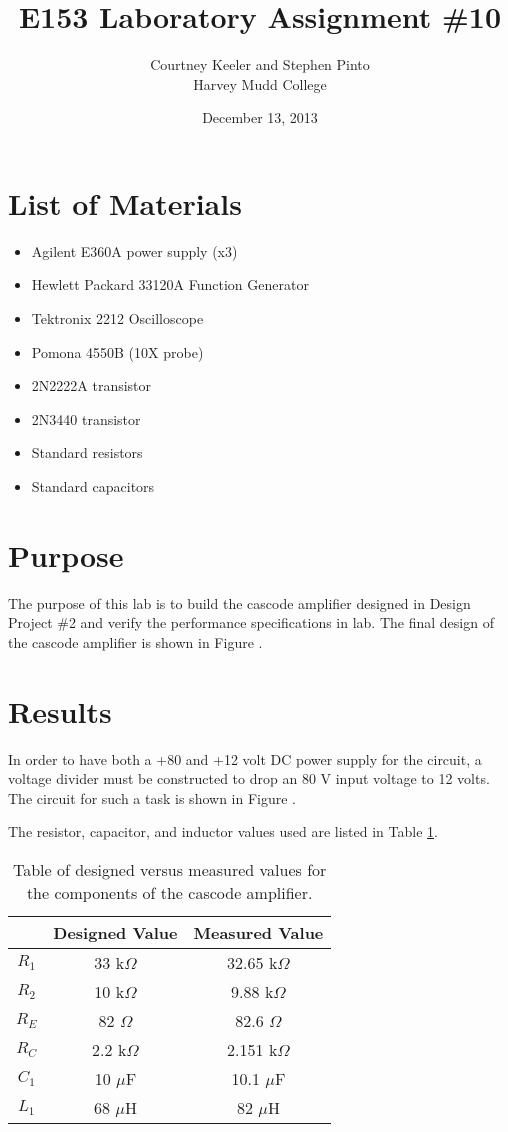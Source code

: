 \documentclass[12pt,letterpaper]{report}
\begin{document}
\title{E153 Laboratory Assignment \#10}
\author{Courtney Keeler and Stephen Pinto\\
Harvey Mudd College}
\date{December 13, 2013}
\maketitle

\section*{List of Materials}
\begin{itemize}
	\item Agilent E360A power supply (x3)
	\item Hewlett Packard 33120A Function Generator
	\item Tektronix 2212 Oscilloscope
	\item Pomona 4550B (10X probe)
	\item 2N2222A transistor
	\item 2N3440 transistor
	\item Standard resistors
	\item Standard capacitors
\end{itemize}

\section*{Purpose}
The purpose of this lab is to build the cascode amplifier designed in Design Project \#2 and verify the performance specifications in lab. The final design of the cascode amplifier is shown in Figure %
.

\section*{Results}

In order to have both a +80 and +12 volt DC power supply for the circuit, a voltage divider must be constructed to drop an 80 V input voltage to 12 volts. The circuit for such a task is shown in Figure %
.


The resistor, capacitor, and inductor values used are listed in Table \ref{tab:values}.
\begin{table}[H]
\centering
\begin{tabular}{|c|c|c|}
	\hline
	 & Designed Value & Measured Value \\
	\hline
	$R_1$ & 33 k$\Omega$ & 32.65 k$\Omega$\\
	\hline
	$R_2$ & 10 k$\Omega$ & 9.88 k$\Omega$ \\
	\hline
	$R_E$ & 82 $\Omega$ & 82.6 $\Omega$ \\
	\hline
	$R_C$ & 2.2 k$\Omega$ & 2.151 k$\Omega$ \\
	\hline
	$C_1$ & 10 $\mu$F & 10.1 $\mu$F \\
	\hline
	$L_1$ & 68 $\mu$H & 82 $\mu$H \\
	\hline
\end{tabular}
\caption{Table of designed versus measured values for the components of the cascode amplifier.}
\label{tab:values}
\end{table}
\end{document}
